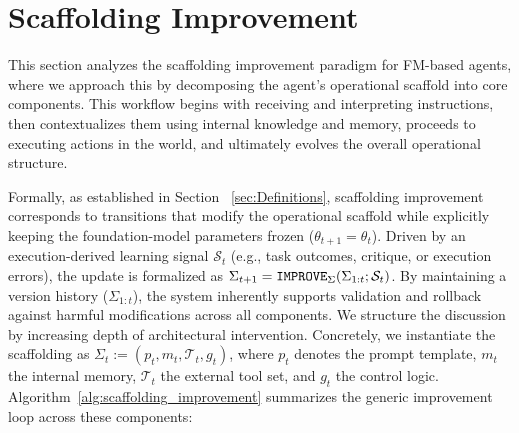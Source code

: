 \section{Scaffolding Improvement}
\label{sec:Scaffolding_Improvement}

This section analyzes the scaffolding improvement paradigm for FM-based agents, where we approach this by decomposing the agent's operational scaffold into core components. This workflow begins with receiving and interpreting instructions, then contextualizes them using internal knowledge and memory, proceeds to executing actions in the world, and ultimately evolves the overall operational structure. 

Formally, as established in Section ~\ref{sec:Definitions}, scaffolding improvement corresponds to transitions that modify the operational scaffold while explicitly keeping the foundation-model parameters frozen ($\theta_{t+1}=\theta_{t}$). Driven by an execution-derived learning signal $\mathcal{S}_{t}$ (e.g., task outcomes, critique, or execution errors), the update is formalized as $\Sigma_{t+1}=\operatorname{\mathtt{IMPROVE}}_{\Sigma}(\Sigma_{1:t};\mathcal{S}_{t})$. By maintaining a version history ($\Sigma_{1:t}$), the system inherently supports validation and rollback against harmful modifications across all components. We structure the discussion by increasing depth of architectural intervention. Concretely, we instantiate the scaffolding as $\Sigma_{t}:=(p_{t},m_{t},\mathcal{T}_{t},g_{t})$, where $p_{t}$ denotes the prompt template, $m_{t}$ the internal memory, $\mathcal{T}_{t}$ the external tool set, and $g_{t}$ the control logic. Algorithm~\ref{alg:scaffolding_improvement} summarizes the generic improvement loop across these components:


